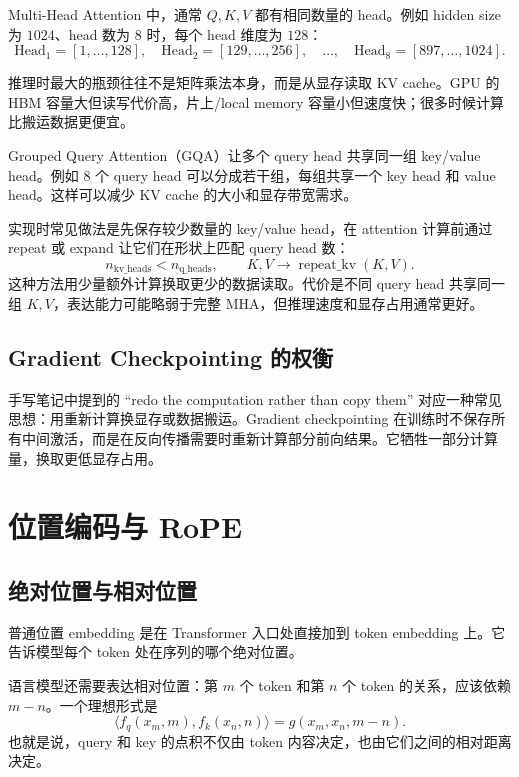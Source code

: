 \documentclass[a4paper,12pt]{article}
\begin{document}
Multi-Head Attention 中，通常 $Q,K,V$ 都有相同数量的 head。例如 hidden size 为 $1024$、head 数为 $8$ 时，每个 head 维度为 $128$：
\[
    \text{Head}_1=[1,\ldots,128],\quad
    \text{Head}_2=[129,\ldots,256],\quad
    \ldots,\quad
    \text{Head}_8=[897,\ldots,1024].
\]

推理时最大的瓶颈往往不是矩阵乘法本身，而是从显存读取 KV cache。GPU 的 HBM 容量大但读写代价高，片上/local memory 容量小但速度快；很多时候计算比搬运数据更便宜。

Grouped Query Attention（GQA）让多个 query head 共享同一组 key/value head。例如 8 个 query head 可以分成若干组，每组共享一个 key head 和 value head。这样可以减少 KV cache 的大小和显存带宽需求。

实现时常见做法是先保存较少数量的 key/value head，在 attention 计算前通过 repeat 或 expand 让它们在形状上匹配 query head 数：
\[
    n_{\text{kv\_heads}} < n_{\text{q\_heads}},\qquad
    K,V \rightarrow \operatorname{repeat\_kv}(K,V).
\]
这种方法用少量额外计算换取更少的数据读取。代价是不同 query head 共享同一组 $K,V$，表达能力可能略弱于完整 MHA，但推理速度和显存占用通常更好。

\subsection{Gradient Checkpointing 的权衡}

手写笔记中提到的 ``redo the computation rather than copy them'' 对应一种常见思想：用重新计算换显存或数据搬运。Gradient checkpointing 在训练时不保存所有中间激活，而是在反向传播需要时重新计算部分前向结果。它牺牲一部分计算量，换取更低显存占用。

\section{位置编码与 RoPE}

\subsection{绝对位置与相对位置}

普通位置 embedding 是在 Transformer 入口处直接加到 token embedding 上。它告诉模型每个 token 处在序列的哪个绝对位置。

语言模型还需要表达相对位置：第 $m$ 个 token 和第 $n$ 个 token 的关系，应该依赖 $m-n$。一个理想形式是
\[
    \langle f_q(x_m,m), f_k(x_n,n)\rangle
    =g(x_m,x_n,m-n).
\]
也就是说，query 和 key 的点积不仅由 token 内容决定，也由它们之间的相对距离决定。
\end{document}
